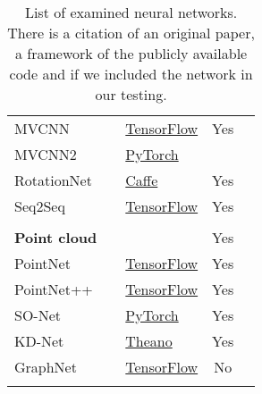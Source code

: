 \begin{table}[]
\begin{tabular}{lllcc}
		MVCNN                  & \cite{su_multi-view_2015}                & \href{https://github.com/WeiTang114/MVCNN-TensorFlow}{TensorFlow}                      &     Yes     &  \\
		MVCNN2                 & \cite{su_deeper_2018}                    & \href{https://github.com/jongchyisu/mvcnn_pytorch}{PyTorch}                            &             &  \\
		RotationNet            & \cite{kanezaki_rotationnet:_2018}        & \href{https://github.com/kanezaki/rotationnet}{Caffe}                                  &     Yes     &  \\
		Seq2Seq                & \cite{zhizhong_seqviews2seqlabels:_2018} & \href{https://github.com/mingyangShang/SeqViews2SeqLabels}{TensorFlow}                 &     Yes     &  \\
		                       &                                          &                                                                                        &             &  \\
		\textbf{Point cloud  } &                                          &                                                                                        &     Yes     &  \\
		PointNet               & \cite{qi_pointnet:_2016}                 & \href{https://github.com/charlesq34/pointnet}{TensorFlow}                              &     Yes     &  \\
		PointNet++             & \cite{qi_pointnet++:_2017}               & \href{https://github.com/charlesq34/pointnet2}{TensorFlow}                             &     Yes     &  \\
		SO-Net                 & \cite{li_so-net:_2018}                   & \href{https://github.com/lijx10/SO-Net}{PyTorch}                                       &     Yes     &  \\
		KD-Net                 & \cite{klokov_escape_2017}                & \href{https://github.com/Regenerator/kdnets}{Theano}                                   &     Yes     &  \\
		GraphNet               & \cite{dominguez_general-purpose_2018}    & \href{https://github.com/WDot/G3DNet}{TensorFlow}                                      &     No      &  \\
		                       &                                          &                                                                                        &             &  \\ \hline
	\end{tabular}
\caption{List of examined neural networks. There is a citation of an original paper, a framework of the publicly available code and if we included the network in our testing.}
\label{Table:1}
\end{table}